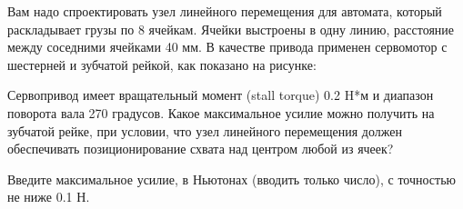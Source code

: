 
Вам надо спроектировать узел линейного перемещения для автомата, который раскладывает грузы по 8 ячейкам.  Ячейки выстроены в одну линию,  расстояние между соседними ячейками 40 мм.  В качестве привода применен сервомотор с шестерней и зубчатой рейкой, как показано на рисунке:


Сервопривод имеет вращательный момент (stall torque) 0.2 H*м  и диапазон поворота вала 270 градусов.  Какое максимальное усилие можно получить на зубчатой рейке, при условии, что узел линейного перемещения должен обеспечивать позиционирование схвата над центром любой из ячеек?   

Введите максимальное усилие, в Ньютонах (вводить только число),  с точностью не ниже 0.1 Н.

